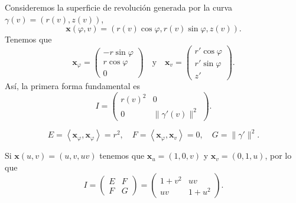 \begin{eg}
Consideremos la superficie de revolución generada por la curva $\displaystyle \gamma\left(v\right)=\left(r\left(v\right), z\left(v\right)\right) $,
\[ \textbf{x} \left(\varphi, v\right)=\left(r\left(v\right)\cos\varphi, r\left(v\right)\sin\varphi, z\left(v\right)\right) .\]
Tenemos que 
\[ \textbf{x} _{\varphi} = \begin{pmatrix} -r \sin \varphi \\ r \cos \varphi \\ 0 \end{pmatrix}\quad \text{y} \quad \textbf{x} _{v}=\begin{pmatrix} r'\cos\varphi \\ r'\sin \varphi \\ z' \end{pmatrix} .\]
Así, la primera forma fundamental es 
\[ I = \begin{pmatrix} r\left(v\right)^{2} & 0 \\ 0 & \|\gamma'\left(v\right)\|^{2} \end{pmatrix} .\]

\[E = \left\langle \textbf{x} _{\varphi}, \textbf{x} _{\varphi} \right\rangle =r^{2}, \quad F = \left\langle \textbf{x} _{\varphi}, \textbf{x} _{v} \right\rangle =0, \quad G = \|\gamma'\|^{2} .\]
\end{eg}
\begin{eg}
Si $\displaystyle \textbf{x} \left(u,v\right)=\left(u,v,uv\right) $ tenemos que $\displaystyle \textbf{x} _{u}= \left(1,0,v\right) $ y $\displaystyle \textbf{x} _{v} = \left(0,1,u\right) $, por lo que 
\[I = \begin{pmatrix} E & F \\ F & G \end{pmatrix}=\begin{pmatrix} 1 + v^{2} & uv \\ uv & 1 + u^{2} \end{pmatrix} .\]
\end{eg}

